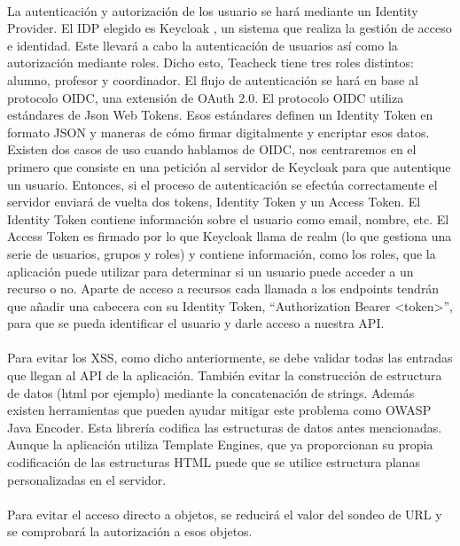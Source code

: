 \paragraph{}
La autenticación y autorización de los usuario se hará mediante un
Identity Provider. El IDP elegido es Keycloak \cite{keycloakDocs}, un sistema que realiza
la gestión de acceso e identidad. Este llevará a cabo la autenticación
de usuarios así como la autorización mediante roles. Dicho esto,
Teacheck tiene tres roles distintos: alumno, profesor y
coordinador. El flujo de autenticación se hará en base al protocolo
OIDC, una extensión de OAuth 2.0. El protocolo OIDC utiliza estándares
de Json Web Tokens. Esos estándares definen un Identity Token en
formato JSON y maneras de cómo firmar digitalmente y encriptar esos
datos. Existen dos casos de uso cuando hablamos de OIDC, nos
centraremos en el primero que consiste en una petición al servidor de
Keycloak para que autentique un usuario. Entonces, si el proceso de
autenticación se efectúa correctamente el servidor enviará de vuelta
dos tokens, Identity Token y un Access Token. El Identity Token
contiene información sobre el usuario como email, nombre, etc. El
Access Token es firmado por lo que Keycloak llama de realm (lo que
gestiona una serie de usuarios, grupos y roles) y contiene
información, como los roles, que la aplicación puede utilizar para
determinar si un usuario puede acceder a un recurso o no. Aparte de
acceso a recursos cada llamada a los endpoints tendrán que añadir una
cabecera con su Identity Token, “Authorization Bearer <token>”, para
que se pueda identificar el usuario y darle acceso a nuestra API.
\paragraph{}
Para evitar los XSS, como dicho anteriormente, se debe validar todas
las entradas que llegan al API de la aplicación. También evitar la
construcción de estructura de datos (html por ejemplo) mediante la
concatenación de strings. Además existen herramientas que pueden
ayudar mitigar este problema como OWASP Java Encoder. Esta librería
codifica las estructuras de datos antes mencionadas. Aunque la
aplicación utiliza Template Engines, que ya proporcionan su propia
codificación de las estructuras HTML puede que se utilice estructura
planas personalizadas en el servidor.
\paragraph{}
Para evitar el acceso directo a objetos, se reducirá el valor del
sondeo de URL y se comprobará la autorización a esos objetos.
